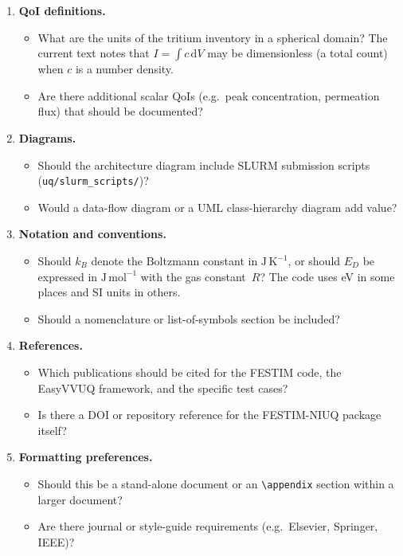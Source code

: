 \documentclass[11pt,a4paper]{article}
\begin{document}
\begin{enumerate}
  \item \textbf{QoI definitions.}
    \begin{itemize}[nosep]
      \item What are the units of the tritium inventory in a spherical
            domain?  The current text notes that
            $I = \int c\,\mathrm{d}V$ may be dimensionless (a total count)
            when $c$ is a number density.
      \item Are there additional scalar QoIs (e.g.\ peak concentration,
            permeation flux) that should be documented?
    \end{itemize}

  \item \textbf{Diagrams.}
    \begin{itemize}[nosep]
      \item Should the architecture diagram include SLURM submission
            scripts (\texttt{uq/slurm\_scripts/})?
      \item Would a data-flow diagram or a UML class-hierarchy diagram add
            value?
    \end{itemize}

  \item \textbf{Notation and conventions.}
    \begin{itemize}[nosep]
      \item Should $k_B$ denote the Boltzmann constant in
            $\mathrm{J\,K^{-1}}$, or should $E_D$ be expressed in
            $\mathrm{J\,mol^{-1}}$ with the gas constant~$R$?  The code
            uses eV in some places and SI units in others.
      \item Should a nomenclature or list-of-symbols section be included?
    \end{itemize}

  \item \textbf{References.}
    \begin{itemize}[nosep]
      \item Which publications should be cited for the FESTIM code, the
            EasyVVUQ framework, and the specific test cases?
      \item Is there a DOI or repository reference for the FESTIM-NIUQ
            package itself?
    \end{itemize}

  \item \textbf{Formatting preferences.}
    \begin{itemize}[nosep]
      \item Should this be a stand-alone document or an
            \texttt{\textbackslash appendix} section within a larger
            document?
      \item Are there journal or style-guide requirements (e.g.\ Elsevier,
            Springer, IEEE)?
    \end{itemize}
\end{enumerate}
\end{document}
